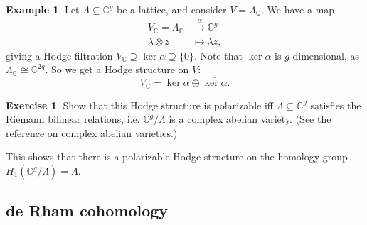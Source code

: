 \documentclass{article}
\theoremstyle{definition}
\newtheorem*{example}{Example}
\newtheorem*{exercise}{Exercise}
\newcommand{\conj}[1]{\overline{#1}}
\newcommand{\Q}{\mathbb{Q}}
\newcommand{\C}{\mathbb{C}}
\begin{document}
\begin{example}
    Let $\Lambda\subseteq\C^g$ be a lattice, and consider $V=\Lambda_\Q$. We
    have a map
    \begin{align*}
        V_\C = \Lambda_\C &\xrightarrow\alpha \C^g \\
        \lambda\otimes z &\mapsto \lambda z,
    \end{align*}
    giving a Hodge filtration $V_\C\supseteq\ker\alpha\supseteq\{0\}$. Note that
    $\ker\alpha$ is $g$-dimensional, as $\Lambda_\C\cong\C^{2g}$. So we get a
    Hodge structure on $V$: %
    \begin{equation*}
        V_\C = \ker\alpha \oplus \conj{\ker\alpha}.
    \end{equation*}
\end{example}

\begin{exercise}
    Show that this Hodge structure is polarizable iff $\Lambda\subseteq\C^g$
    satisfies the Riemann bilinear relations, i.e. $\C^g/\Lambda$ is a complex
    abelian variety. (See the reference on complex abelian varieties.)

    This shows that there is a polarizable Hodge structure on the homology group
    $H_1(\C^g/\Lambda)=\Lambda$.
\end{exercise}

\subsection*{de Rham cohomology}
\end{document}
